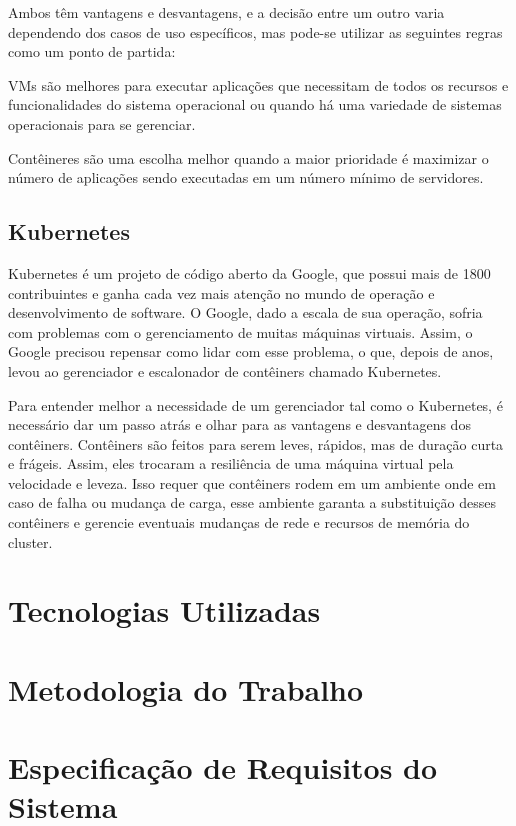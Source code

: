 \documentclass[]{politex}
\begin{document}
	Ambos têm vantagens e desvantagens, e a decisão entre um outro varia dependendo dos casos de uso específicos, mas pode-se utilizar as seguintes regras como um ponto de partida:
	
	VMs são melhores para executar aplicações que necessitam de todos os recursos e funcionalidades do sistema operacional ou quando há uma variedade de sistemas operacionais para se gerenciar.
	
	Contêineres são uma escolha melhor quando a maior prioridade é maximizar o número de aplicações sendo executadas em um número mínimo de servidores.
	
	\section{Kubernetes}
	Kubernetes é um projeto de código aberto da Google, que possui mais de 1800 contribuintes e ganha cada vez mais atenção no mundo de operação e desenvolvimento de software. 
	O Google, dado a escala de sua operação, sofria com problemas com o gerenciamento de muitas máquinas virtuais. 
	Assim, o Google precisou repensar como lidar com esse problema, o que, depois de anos, levou ao gerenciador e escalonador de contêiners chamado Kubernetes.

	Para entender melhor a necessidade de um gerenciador tal como o Kubernetes, é necessário dar um passo atrás e olhar para as vantagens e desvantagens dos contêiners.
	Contêiners são feitos para serem leves, rápidos, mas de duração curta e frágeis.
	Assim, eles trocaram a resiliência de uma máquina virtual pela velocidade e leveza. Isso requer que contêiners rodem em um ambiente onde em caso de falha ou mudança de carga, esse ambiente garanta a substituição desses contêiners e gerencie eventuais mudanças de rede e recursos de memória do cluster.
 
\chapter{Tecnologias Utilizadas}
	

\chapter{Metodologia do Trabalho}
	

\chapter{Especificação de Requisitos do Sistema}
	
\end{document}

